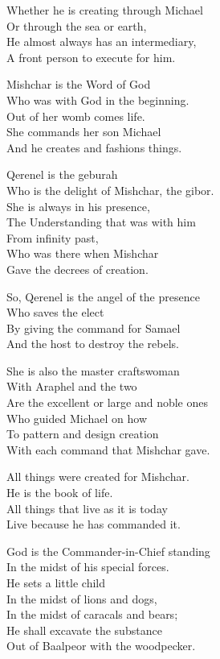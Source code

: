 \documentclass[
]{book}
\begin{document}
Whether he is creating through Michael\\
Or through the sea or earth,\\
He almost always has an intermediary,\\
A front person to execute for him.

Mishchar is the Word of God\\
Who was with God in the beginning.\\
Out of her womb comes life.\\
She commands her son Michael\\
And he creates and fashions things.

Qerenel is the geburah\\
Who is the delight of Mishchar, the gibor.\\
She is always in his presence,\\
The Understanding that was with him\\
From infinity past,\\
Who was there when Mishchar\\
Gave the decrees of creation.

So, Qerenel is the angel of the presence\\
Who saves the elect\\
By giving the command for Samael\\
And the host to destroy the rebels.

She is also the master craftswoman\\
With Araphel and the two\\
Are the excellent or large and noble ones\\
Who guided Michael on how\\
To pattern and design creation\\
With each command that Mishchar gave.

All things were created for Mishchar.\\
He is the book of life.\\
All things that live as it is today\\
Live because he has commanded it.

God is the Commander-in-Chief standing\\
In the midst of his special forces.\\
He sets a little child\\
In the midst of lions and dogs,\\
In the midst of caracals and bears;\\
He shall excavate the substance\\
Out of Baalpeor with the woodpecker.
\end{document}
